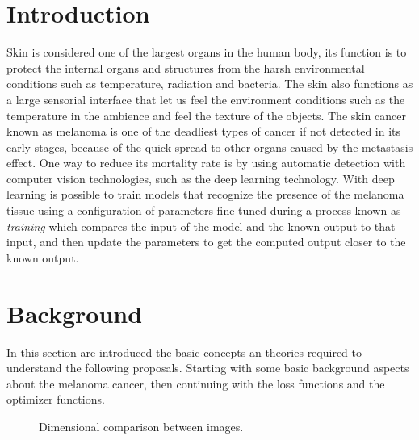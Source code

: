 \section{Introduction}
Skin is considered one of the largest organs in the human body, its function is to protect the internal organs and structures from the harsh environmental conditions such as temperature, radiation and bacteria. The skin also functions as a large sensorial interface that let us feel the environment conditions such as the temperature in the ambience and feel the texture of the objects.
The skin cancer known as melanoma is one of the deadliest types of cancer if not detected in its early stages, because of the quick spread to other organs caused by the metastasis effect. One way to reduce its mortality rate is by using automatic detection with computer vision technologies, such as the deep learning technology. With deep learning is possible to train models that recognize the presence of the melanoma tissue using a configuration of parameters fine-tuned during a process known as \emph{training} which compares the input of the model and the known output to that input, and then update the parameters to get the computed output closer to the known output.


\section{Background}
In this section are introduced the basic concepts an theories required to understand the following proposals. Starting with some basic background aspects about the melanoma cancer, then continuing with the loss functions and the optimizer functions.


\begin{figure*}[htp]
  \centering
  \qquad
  \caption{Dimensional comparison between images.}
\end{figure*}



